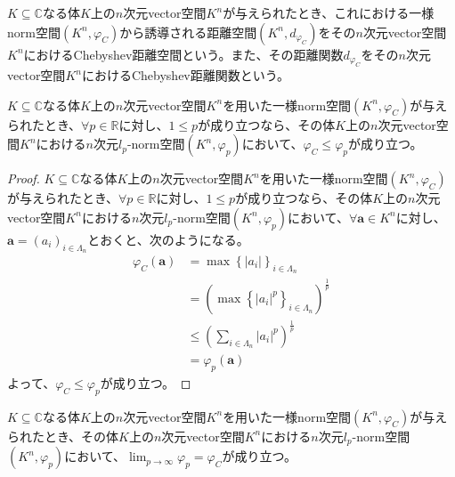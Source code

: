 \documentclass[dvipdfmx]{jsarticle}
\begin{document}
\begin{dfn}
$K \subseteq \mathbb{C}$なる体$K$上の$n$次元vector空間$K^{n}$が与えられたとき、これにおける一様norm空間$\left( K^{n},\varphi_{C} \right)$から誘導される距離空間$\left( K^{n},d_{\varphi_{C}} \right)$をその$n$次元vector空間$K^{n}$におけるChebyshev距離空間という。また、その距離関数$d_{\varphi_{C}}$をその$n$次元vector空間$K^{n}$におけるChebyshev距離関数という。
\end{dfn}
\begin{thm}\label{2.3.2.5}
$K \subseteq \mathbb{C}$なる体$K$上の$n$次元vector空間$K^{n}$を用いた一様norm空間$\left( K^{n},\varphi_{C} \right)$が与えられたとき、$\forall p \in \mathbb{R}$に対し、$1 \leq p$が成り立つなら、その体$K$上の$n$次元vector空間$K^{n}$における$n$次元$l_{p}$-norm空間$\left( K^{n},\varphi_{p} \right)$において、$\varphi_{C} \leq \varphi_{p}$が成り立つ。
\end{thm}
\begin{proof}
$K \subseteq \mathbb{C}$なる体$K$上の$n$次元vector空間$K^{n}$を用いた一様norm空間$\left( K^{n},\varphi_{C} \right)$が与えられたとき、$\forall p \in \mathbb{R}$に対し、$1 \leq p$が成り立つなら、その体$K$上の$n$次元vector空間$K^{n}$における$n$次元$l_{p}$-norm空間$\left( K^{n},\varphi_{p} \right)$において、$\forall\mathbf{a} \in K^{n}$に対し、$\mathbf{a} = \left( a_{i} \right)_{i \in \varLambda_{n}}$とおくと、次のようになる。
\begin{align*}
\varphi_{C}\left( \mathbf{a} \right) &= \max\left\{ \left| a_{i} \right| \right\}_{i \in \varLambda_{n}}\\
&= \left( \max\left\{ \left| a_{i} \right|^{p} \right\}_{i \in \varLambda_{n}} \right)^{\frac{1}{p}}\\
&\leq \left( \sum_{i \in \varLambda_{n}} \left| a_{i} \right|^{p} \right)^{\frac{1}{p}}\\
&= \varphi_{p}\left( \mathbf{a} \right)
\end{align*}
よって、$\varphi_{C} \leq \varphi_{p}$が成り立つ。
\end{proof}
\begin{thm}\label{2.3.2.6}
$K \subseteq \mathbb{C}$なる体$K$上の$n$次元vector空間$K^{n}$を用いた一様norm空間$\left( K^{n},\varphi_{C} \right)$が与えられたとき、その体$K$上の$n$次元vector空間$K^{n}$における$n$次元$l_{p}$-norm空間$\left( K^{n},\varphi_{p} \right)$において、$\lim_{p \rightarrow \infty}\varphi_{p} = \varphi_{C}$が成り立つ。
\end{thm}
\end{document}
